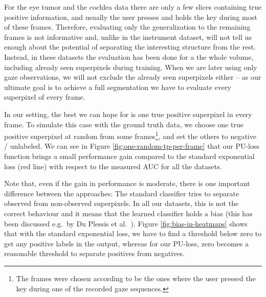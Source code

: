 For the eye tumor and the cochlea data there are only a few slices containing true positive information, and usually the user presses and holds the key during most of these frames. 
Therefore, evaluating only the generalization to the remaining frames is not informative and, unlike in the instrument dataset, will not tell us enough about the potential of separating the interesting structure from the rest. 
Instead, in these datasets the evaluation has been done for a the whole volume, including already seen superpixels during training. 
When we are later using only gaze observations, we will not exclude the already seen superpixels either -- as our ultimate goal is to achieve a full segmentation we have to evaluate every superpixel of every frame.

In our setting, the best we can hope for is one true positive superpixel in every frame. 
To simulate this case with the ground truth data, we choose one true positive superpixel at random from some frames\footnote{The frames were chosen according to be the ones where the user pressed the key during one of the recorded gaze sequences.}, and set the others to negative / unlabeled. We can see in Figure \ref{fig:one-random-tp-per-frame} that our PU-loss function brings a small performance gain compared to the standard exponential loss (red line) with respect to the measured AUC for all the datasets. 

Note that, even if the gain in performance is moderate, there is one important difference between the approaches: The standard classifier tries to separate observed from non-observed superpixels. In all our datasets, this is not the correct behaviour and it means that the learned classifier holds a bias (this has been discussed e.g.\ by Du Plessis et al.\ \cite{plessis2014PUanalysis}). Figure \ref{fig:bias-in-heatmaps} shows that with the standard exponential loss, we have to find a threshold below zero to get any positive labels in the output, whereas for our PU-loss, zero becomes a reasonable threshold to separate positives from negatives.

